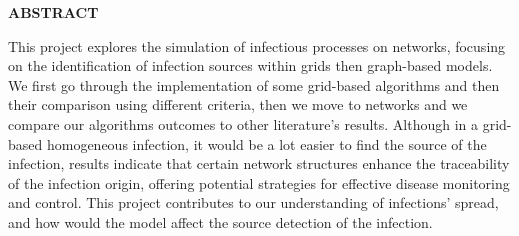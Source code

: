 \begin{center}
    \thispagestyle{empty} %
    \Large \textbf{ABSTRACT}\\[2cm]
\end{center}

\noindent
This project explores the simulation of infectious processes on networks, focusing on the identification of infection sources within grids then graph-based models. We first go through the implementation of some grid-based algorithms and then their comparison using different criteria, then we move to networks and we compare our algorithms outcomes to other literature's results. Although in a grid-based homogeneous infection, it would be a lot easier to find the source of the infection, results indicate that certain network structures enhance the traceability of the infection origin, offering potential strategies for effective disease monitoring and control. This project contributes to our understanding of infections' spread, and how would the model affect the source detection of the infection.